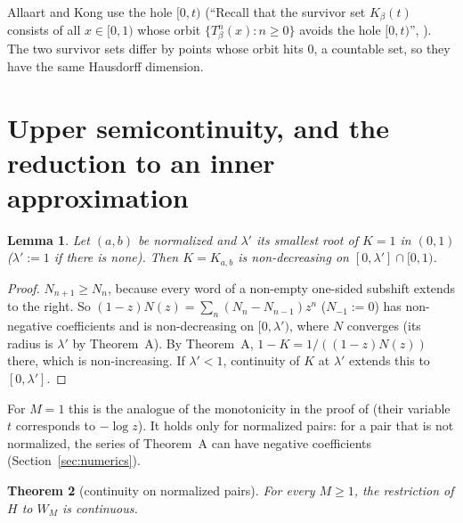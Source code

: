 \documentclass[11pt]{amsart}
\newtheorem{theorem}{Theorem}[section]
\newtheorem{lemma}[theorem]{Lemma}
\theoremstyle{definition}
\theoremstyle{remark}
\begin{document}
Allaart and Kong use the hole $[0,t)$ (``Recall that the survivor set $K_\beta(t)$ consists of all $x\in[0,1)$ whose orbit $\{T_\beta^n(x):n\ge0\}$ avoids the hole $[0,t)$'', \cite[Section~6]{AKgen}). The two survivor sets differ by points whose orbit hits $0$, a countable set, so they have the same Hausdorff dimension.

\section{Upper semicontinuity, and the reduction to an inner approximation}\label{sec:semi}

\begin{lemma}\label{lem:mono}
Let $(a,b)$ be normalized and $\lambda'$ its smallest root of $K=1$ in $(0,1)$ ($\lambda':=1$ if there is none). Then $K=K_{a,b}$ is non-decreasing on $[0,\lambda']\cap[0,1)$.
\end{lemma}

\begin{proof}
$N_{n+1}\ge N_n$, because every word of a non-empty one-sided subshift extends to the right. So $(1-z)N(z)=\sum_n(N_n-N_{n-1})z^n$ ($N_{-1}:=0$) has non-negative coefficients and is non-decreasing on $[0,\lambda')$, where $N$ converges (its radius is $\lambda'$ by Theorem~A). By Theorem~A, $1-K=1/((1-z)N(z))$ there, which is non-increasing. If $\lambda'<1$, continuity of $K$ at $\lambda'$ extends this to $[0,\lambda']$.
\end{proof}

For $M=1$ this is the analogue of the monotonicity in the proof of \cite[Lemma~3.6]{LSZ} (their variable $t$ corresponds to $-\log z$). It holds only for normalized pairs: for a pair that is not normalized, the series of Theorem~A can have negative coefficients (Section~\ref{sec:numerics}).

\begin{theorem}[continuity on normalized pairs]\label{thm:M1}
For every $M\ge1$, the restriction of $H$ to $W_M$ is continuous.
\end{theorem}
\end{document}
